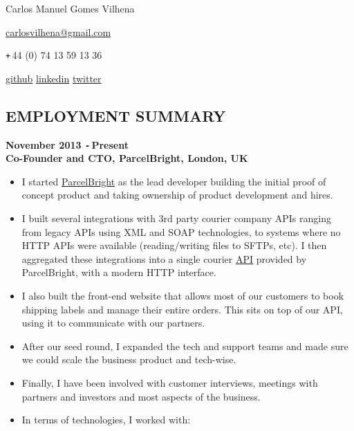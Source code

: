 \documentclass{res}
\def\Plus{\texttt{+}\,}
\def\Minus{\texttt{-}\,}
\begin{document}
\thispagestyle{empty}
\centerline{Carlos Manuel Gomes Vilhena}
\vspace{0.1in}
\centerline{
  \href{mailto:carlosvilhena@gmail.com}{carlosvilhena@gmail.com}
}
\centerline{\Plus 44 (0) 74 13 59 13 36}
\centerline{
  \href{http://github.com/carvil}{github} \hspace{0.5 cm}
  \href{http://www.linkedin.com/in/carlosvilhena}{linkedin}  \hspace{0.5 cm}
  \href{http://www.twitter.com/carvil_}{twitter}
}

\begin{resume}
\vspace{0.1in}


\section{EMPLOYMENT SUMMARY}
\vspace{0.1in}
  {\bf November 2013 \Minus Present}\\
  {\bf Co-Founder and CTO, ParcelBright, London, UK}
    \begin{itemize}
      \item[] I started \href{https://www.parcelbright.com/}{ParcelBright} as
        the lead developer building the initial proof of concept product and
        taking ownership of product development and hires.
      \item[] I built several integrations with 3rd party courier company
        APIs ranging from legacy APIs using XML and SOAP technologies, to
        systems where no HTTP APIs were available (reading/writing files to
        SFTPs, etc). I then aggregated these integrations into a single
        courier \href{https://github.com/parcelbright/api-docs}{API} provided by
        ParcelBright, with a modern HTTP interface.
      \item[] I also built the front-end website that allows most of our
        customers to book shipping labels and manage their entire orders. This
        sits on top of our API, using it to communicate with our partners.
      \item[] After our seed round, I expanded the tech and support teams
        and made sure we could scale the business product and tech-wise.
      \item[] Finally, I have been involved with customer interviews, meetings
        with partners and investors and most aspects of the business.
      \item[] In terms of technologies, I worked with:

\end{itemize}
\end{resume}
\end{document}
